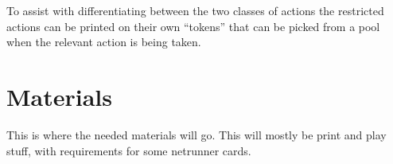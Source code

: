 \documentclass[titlepage]{article}
\begin{document}
To assist with differentiating between the two classes of actions the restricted actions can be printed on their own ``tokens'' that can be picked from a pool when the relevant action is being taken.
\section{Materials}
This is where the needed materials will go. This will mostly be print and play stuff, with requirements for some netrunner cards.
\end{document}
